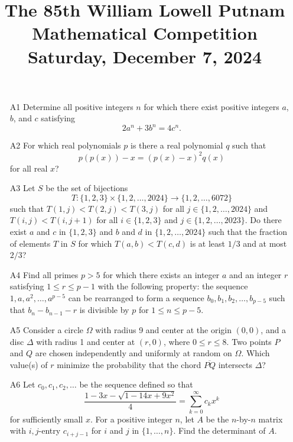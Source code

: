 \documentclass[amssymb,twocolumn,pra,10pt,aps,nofootinbib]{revtex4-1}
\begin{document}
\title{The 85th William Lowell Putnam Mathematical Competition \\
    Saturday, December 7, 2024}
\maketitle

\begin{itemize}

\item[A1] Determine all positive integers $n$ for which there exist positive integers $a$, $b$, and $c$ satisfying \[ 2a^n + 3b^n = 4c^n. \]

\item[A2] For which real polynomials $p$ is there a real polynomial $q$ such that \[ p(p(x)) - x = (p(x) - x)^2 q(x) \] for all real $x$?

\item[A3] Let $S$ be the set of bijections \[ T \colon \{1,2,3\} \times \{1,2,\dots,2024\} \to \{1,2,\dots,6072\} \] such that $T(1,j) < T(2,j) < T(3,j)$ for all $j \in \{1,2,\dots,2024\}$ and $T(i,j) < T(i,j+1)$ for all $i \in \{1,2,3\}$ and $j \in \{1,2,\dots,2023\}$. Do there exist $a$ and $c$ in $\{1,2,3\}$ and $b$ and $d$ in $\{1,2,\dots,2024\}$ such that the fraction of elements $T$ in $S$ for which $T(a,b) < T(c,d)$ is at least $1/3$ and at most $2/3$?

\item[A4] Find all primes $p > 5$ for which there exists an integer $a$ and an integer $r$ satisfying $1 \leq r \leq p-1$ with the following property: the sequence $1,a,a^2,\dots,a^{p-5}$ can be rearranged to form a sequence $b_0,b_1,b_2,\dots,b_{p-5}$ such that $b_n-b_{n-1}-r$ is divisible by $p$ for $1 \leq n \leq p-5$.

\item[A5] Consider a circle $\Omega$ with radius 9 and center at the origin $(0,0)$, and a disc $\Delta$ with radius 1 and center at $(r,0)$, where $0 \leq r \leq 8$. Two points $P$ and $Q$ are chosen independently and uniformly at random on $\Omega$. Which value(s) of $r$ minimize the probability that the chord $\overline{PQ}$ intersects $\Delta$?

\item[A6] Let $c_0,c_1,c_2,\dots$ be the sequence defined so that \[ \frac{1-3x-\sqrt{1-14x+9x^2}}{4} = \sum_{k=0}^\infty c_k x^k \] for sufficiently small $x$. For a positive integer $n$, let $A$ be the $n$-by-$n$ matrix with $i,j$-entry $c_{i+j-1}$ for $i$ and $j$ in $\{1,\dots,n\}$. Find the determinant of $A$.


\end{itemize}
\end{document}
